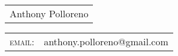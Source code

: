 \documentclass[a4paper,10pt]{article}
\begin{document}
\newcommand*{\fontin}[2]{{\setmainfont{Fontin}#1{#2}}}

\pagestyle{empty} %




\begin{tabular}{l}

{\Huge Anthony Polloreno}\\\end{tabular} \hfill
\begin{tabular}{lr}
    \fontin{\textsc}{email:}     & anthony.polloreno@gmail.com
\end{tabular}
\end{document}
